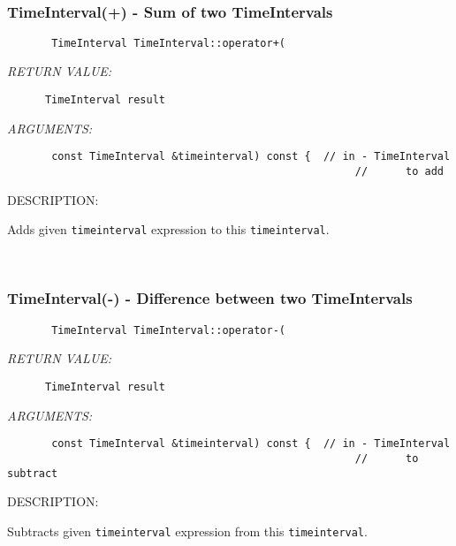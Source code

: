 \mbox{}\hrulefill\ 
 
\subsubsection [TimeInterval(+)] {TimeInterval(+) - Sum of two TimeIntervals}


      
\begin{verbatim}       TimeInterval TimeInterval::operator+(
      \end{verbatim}{\em RETURN VALUE:}
\begin{verbatim}      TimeInterval result
      \end{verbatim}{\em ARGUMENTS:}
\begin{verbatim}       const TimeInterval &timeinterval) const {  // in - TimeInterval
                                                       //      to add\end{verbatim}
{\sf DESCRIPTION:\\ }


      Adds given {\tt timeinterval} expression to this {\tt timeinterval}.
   
 
\mbox{}\hrulefill\ 
 
\subsubsection [TimeInterval(-)] {TimeInterval(-) - Difference between two TimeIntervals}


      
\begin{verbatim}       TimeInterval TimeInterval::operator-(
      \end{verbatim}{\em RETURN VALUE:}
\begin{verbatim}      TimeInterval result
      \end{verbatim}{\em ARGUMENTS:}
\begin{verbatim}       const TimeInterval &timeinterval) const {  // in - TimeInterval
                                                       //      to subtract\end{verbatim}
{\sf DESCRIPTION:\\ }


      Subtracts given {\tt timeinterval} expression from this 
      {\tt timeinterval}.
   
 
